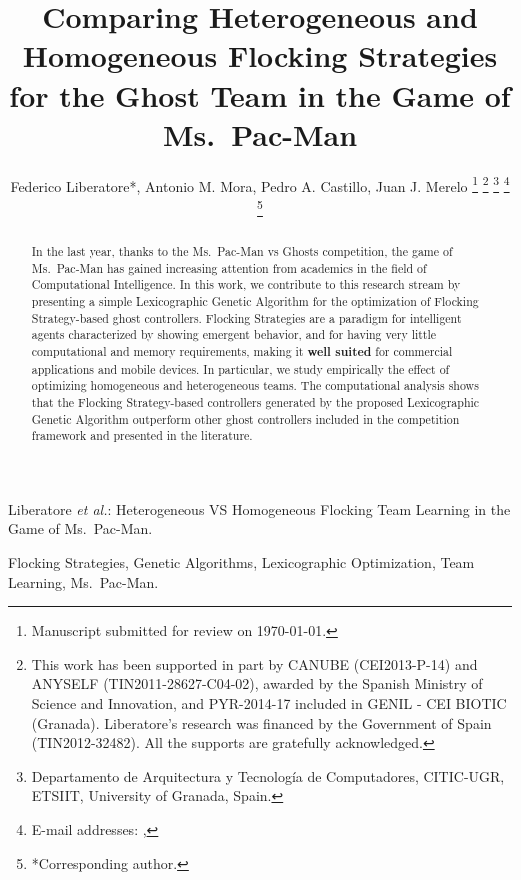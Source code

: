 \documentclass[journal]{IEEEtran}
\begin{document}
\title{Comparing Heterogeneous and Homogeneous Flocking Strategies for the Ghost Team in the Game of Ms.\  Pac-Man}

\author{Federico Liberatore*, Antonio M. Mora, Pedro A. Castillo, Juan J. Merelo
\thanks{Manuscript submitted for review on \today.}%
\thanks{This work has been supported in part by CANUBE (CEI2013-P-14) and ANYSELF (TIN2011-28627-C04-02), awarded by the Spanish Ministry of Science and Innovation, and PYR-2014-17 included in GENIL - CEI BIOTIC (Granada). Liberatore's research was financed by the Government of Spain (TIN2012-32482). All the supports are gratefully acknowledged.}%
\thanks{Departamento de Arquitectura y Tecnolog\'ia de Computadores,
CITIC-UGR, ETSIIT,
University of Granada, Spain.}%
\thanks{E-mail addresses: \mailsa, \mailsb}%
\thanks{*Corresponding author.}}

%
{Liberatore \MakeLowercase{\textit{et al.}}: Heterogeneous VS Homogeneous Flocking Team Learning in the Game of Ms.\  Pac-Man.}
\maketitle

\begin{abstract}
In the last year, thanks to the Ms.\  Pac-Man vs Ghosts competition, the
game of Ms.\  Pac-Man has gained increasing attention from academics in
the field of Computational Intelligence. In this work, we contribute
to this research stream by presenting a simple Lexicographic Genetic
Algorithm for the optimization of Flocking Strategy-based ghost
controllers. Flocking Strategies are a paradigm for intelligent agents
characterized by showing emergent behavior, and for having very little
computational and memory requirements, making it \textbf{well suited} for
commercial applications and mobile devices. In particular, we study
empirically the effect of optimizing homogeneous and heterogeneous
teams. The computational analysis shows that the Flocking
Strategy-based controllers generated by the proposed Lexicographic
Genetic Algorithm outperform other ghost controllers
included in the competition framework and presented in the
literature. 
\end{abstract}
\begin{IEEEkeywords}
Flocking Strategies, Genetic Algorithms, Lexicographic Optimization, Team Learning, Ms.\  Pac-Man.
\end{IEEEkeywords}
\end{document}
